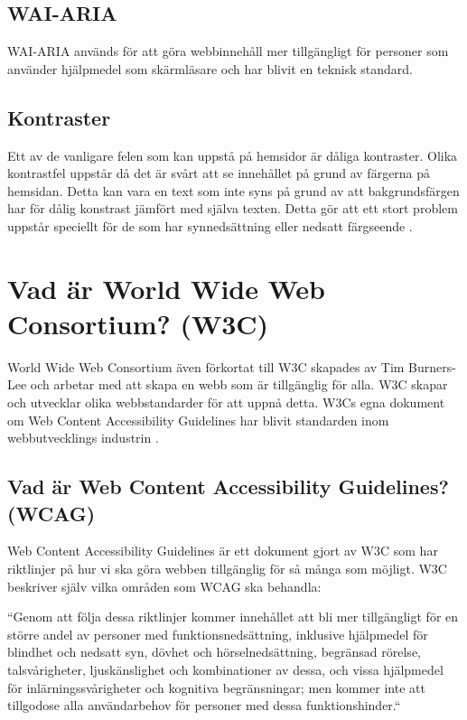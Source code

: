 \documentclass[11p]{article}
\begin{document}
\subsection{WAI-ARIA}
WAI-ARIA används för att göra webbinnehåll mer tillgängligt för personer som använder hjälpmedel som skärmläsare och har blivit en teknisk standard. \textcite{ARIA}


\subsection{Kontraster}
Ett av de vanligare felen som kan uppstå på hemsidor är dåliga kontraster.
Olika kontrastfel uppstår då det är svårt att se innehållet på grund av färgerna på hemsidan.
Detta kan vara en text som inte syns på grund av att bakgrundsfärgen har för dålig konstrast jämfört med själva texten.
Detta gör att ett stort problem uppstår speciellt för de som har synnedsättning eller nedsatt färgseende \textcite{Digg_2021}.

\section{Vad är World Wide Web Consortium? (W3C)}
World Wide Web Consortium även förkortat till W3C skapades av Tim Burners-Lee och arbetar med att skapa en webb som är tillgänglig för alla.
W3C skapar och utvecklar olika webbstandarder för att uppnå detta.
W3Cs egna dokument om Web Content Accessibility Guidelines har blivit standarden inom webbutvecklings industrin \textcite{W3C}.

\subsection{Vad är Web Content Accessibility Guidelines? (WCAG)}
Web Content Accessibility Guidelines är ett dokument gjort av W3C som har riktlinjer på hur vi ska göra webben tillgänglig för så många som möjligt.
W3C beskriver själv vilka områden som WCAG ska behandla:

``Genom att följa dessa riktlinjer kommer innehållet att bli mer tillgängligt för en större andel av personer med funktionsnedsättning, inklusive hjälpmedel för blindhet och nedsatt syn, dövhet och hörselnedsättning, begränsad rörelse, talsvårigheter, ljuskänslighet och kombinationer av dessa, och vissa hjälpmedel för inlärningssvårigheter och kognitiva begränsningar; men kommer inte att tillgodose alla användarbehov för personer med dessa funktionshinder.`` \textcite{WCAG}
\end{document}
